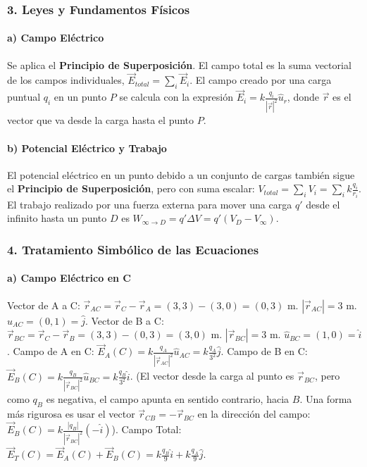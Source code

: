 \subsubsection*{3. Leyes y Fundamentos Físicos}
\paragraph*{a) Campo Eléctrico}
Se aplica el \textbf{Principio de Superposición}. El campo total es la suma vectorial de los campos individuales, $\vec{E}_{total} = \sum_i \vec{E}_i$. El campo creado por una carga puntual $q_i$ en un punto $P$ se calcula con la expresión $\vec{E}_i = k \frac{q_i}{|\vec{r}|^2} \hat{u}_r$, donde $\vec{r}$ es el vector que va desde la carga hasta el punto $P$.

\paragraph*{b) Potencial Eléctrico y Trabajo}
El potencial eléctrico en un punto debido a un conjunto de cargas también sigue el \textbf{Principio de Superposición}, pero con suma escalar: $V_{total} = \sum_i V_i = \sum_i k \frac{q_i}{r_i}$. El trabajo realizado por una fuerza externa para mover una carga $q'$ desde el infinito hasta un punto $D$ es $W_{\infty \to D} = q' \Delta V = q' (V_D - V_\infty)$.

\subsubsection*{4. Tratamiento Simbólico de las Ecuaciones}
\paragraph*{a) Campo Eléctrico en C}
Vector de A a C: $\vec{r}_{AC} = \vec{r}_C - \vec{r}_A = (3,3) - (3,0) = (0,3)$ m. $|\vec{r}_{AC}| = 3$ m. $\hat{u}_{AC} = (0,1) = \hat{j}$.
Vector de B a C: $\vec{r}_{BC} = \vec{r}_C - \vec{r}_B = (3,3) - (0,3) = (3,0)$ m. $|\vec{r}_{BC}| = 3$ m. $\hat{u}_{BC} = (1,0) = \hat{i}$.
Campo de A en C: $\vec{E}_A(C) = k \frac{q_A}{|\vec{r}_{AC}|^2} \hat{u}_{AC} = k \frac{q_A}{3^2} \hat{j}$.
Campo de B en C: $\vec{E}_B(C) = k \frac{q_B}{|\vec{r}_{BC}|^2} \hat{u}_{BC} = k \frac{q_B}{3^2} \hat{i}$. (El vector desde la carga al punto es $\vec{r}_{BC}$, pero como $q_B$ es negativa, el campo apunta en sentido contrario, hacia $B$. Una forma más rigurosa es usar el vector $\vec{r}_{CB} = -\vec{r}_{BC}$ en la dirección del campo: $\vec{E}_B(C) = k \frac{|q_B|}{|\vec{r}_{BC}|^2} (-\hat{i})$).
Campo Total: $\vec{E}_T(C) = \vec{E}_A(C) + \vec{E}_B(C) = k \frac{q_B}{9}\hat{i} + k \frac{q_A}{9}\hat{j}$.

